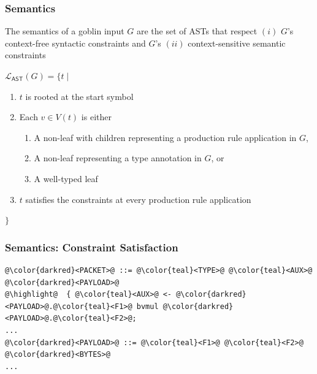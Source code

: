 \documentclass[11pt,xcolor={dvipsnames},hyperref={pdftex,pdfpagemode=UseNone,hidelinks,pdfdisplaydoctitle=true},usepdftitle=false]{beamer}
\newcommand{\green}[1]{\textcolor{green!60!black}{#1}}
\newcommand{\blue}[1]{\textcolor{blue!70!black}{#1}}
\begin{document}
\begin{frame} 
    \frametitle{Semantics}
    The \green{semantics} of a goblin input \blue{$G$} are the set of ASTs that 
    respect $(i)$ \blue{$G$}'s context-free syntactic constraints and \blue{$G$}'s 
    $(ii)$ context-sensitive semantic constraints \pause 

    \blue{$\mathcal{L}_{\mathsf{AST}}(G) = \{ t \mid $}
\begin{enumerate}
    \item \blue{$t$} is rooted at the start symbol\pause
    \item Each \blue{$v \in V(t)$} is either \pause
    \begin{enumerate}
        \item A non-leaf with children representing a production rule application in \blue{$G$},\pause
        \item A non-leaf representing a type annotation in \blue{$G$}, or\pause
        \item A well-typed leaf\pause
    \end{enumerate}
    \item \blue{$t$} satisfies the constraints at every production rule application
\end{enumerate}
    \blue{$\}$}
\end{frame}

\begin{frame} [fragile]
    \frametitle{Semantics: Constraint Satisfaction}
 \begin{lstlisting}[style=goblin]
@\color{darkred}<PACKET>@ ::= @\color{teal}<TYPE>@ @\color{teal}<AUX>@ @\color{darkred}<PAYLOAD>@
@\highlight@  { @\color{teal}<AUX>@ <- @\color{darkred}<PAYLOAD>@.@\color{teal}<F1>@ bvmul @\color{darkred}<PAYLOAD>@.@\color{teal}<F2>@;
...
@\color{darkred}<PAYLOAD>@ ::= @\color{teal}<F1>@ @\color{teal}<F2>@ @\color{darkred}<BYTES>@ 
...
\end{lstlisting}

\newcommand{\dttree}{%
  }
  {\center \dttree}
\end{frame}
\end{document}
